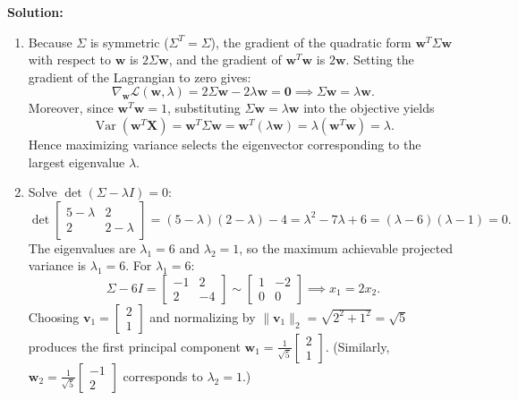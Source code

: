 \documentclass[11pt, letterpaper]{article}
\theoremstyle{definition}
\theoremstyle{remark}
\begin{document}
\textbf{Solution:}
\begin{enumerate}[label=(\alph*)]
    \item Because $\Sigma$ is symmetric ($\Sigma^T = \Sigma$), the gradient of the quadratic form $\mathbf{w}^T \Sigma \mathbf{w}$ with respect to $\mathbf{w}$ is $2\Sigma\mathbf{w}$, and the gradient of $\mathbf{w}^T\mathbf{w}$ is $2\mathbf{w}$. Setting the gradient of the Lagrangian to zero gives:
    \[
    \nabla_{\mathbf{w}} \mathcal{L}(\mathbf{w}, \lambda) = 2\Sigma\mathbf{w} - 2\lambda\mathbf{w} = \mathbf{0} \implies \Sigma\mathbf{w} = \lambda\mathbf{w}.
    \]
    Moreover, since $\mathbf{w}^T\mathbf{w} = 1$, substituting $\Sigma\mathbf{w} = \lambda\mathbf{w}$ into the objective yields
    \[
    \operatorname{Var}(\mathbf{w}^T\mathbf{X}) = \mathbf{w}^T \Sigma \mathbf{w} = \mathbf{w}^T (\lambda\mathbf{w}) = \lambda(\mathbf{w}^T\mathbf{w}) = \lambda.
    \]
    Hence maximizing variance selects the eigenvector corresponding to the largest eigenvalue $\lambda$.

    \item Solve $\det(\Sigma - \lambda I) = 0$:
    \[
    \det \begin{bmatrix} 5 - \lambda & 2 \\ 2 & 2 - \lambda \end{bmatrix} = (5 - \lambda)(2 - \lambda) - 4 = \lambda^2 - 7\lambda + 6 = (\lambda - 6)(\lambda - 1) = 0.
    \]
    The eigenvalues are $\lambda_1 = 6$ and $\lambda_2 = 1$, so the maximum achievable projected variance is $\lambda_1 = 6$. For $\lambda_1 = 6$:
    \[
    \Sigma - 6I = \begin{bmatrix} -1 & 2 \\ 2 & -4 \end{bmatrix} \sim \begin{bmatrix} 1 & -2 \\ 0 & 0 \end{bmatrix} \implies x_1 = 2x_2.
    \]
    Choosing $\mathbf{v}_1 = \begin{bmatrix} 2 \\ 1 \end{bmatrix}$ and normalizing by $\|\mathbf{v}_1\|_2 = \sqrt{2^2 + 1^2} = \sqrt{5}$ produces the first principal component $\mathbf{w}_1 = \frac{1}{\sqrt{5}}\begin{bmatrix} 2 \\ 1 \end{bmatrix}$. (Similarly, $\mathbf{w}_2 = \frac{1}{\sqrt{5}}\begin{bmatrix} -1 \\ 2 \end{bmatrix}$ corresponds to $\lambda_2 = 1$.)


\end{enumerate}
\end{document}
